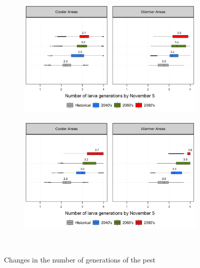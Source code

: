 \documentclass[12pt]{article}
\theoremstyle{plain}
\theoremstyle{definition}
\theoremstyle{definition}
\begin{document}
\begin{figure}[h!]
\begin{subfigure}[b]{0.45\textwidth}
    \end{subfigure}\\    
          \begin{subfigure}[b]{0.45\textwidth}
        \includegraphics[width=\textwidth]{figures/Larva_Gen_Nov_rcp45}
    \end{subfigure}
    \begin{subfigure}[b]{0.45\textwidth}
        \includegraphics[width=\textwidth]{figures/Larva_Gen_Nov_rcp85}
    \end{subfigure}\\
    \caption{Changes in the number of generations of the pest}\label{fig:CNGP}
\end{figure}
\end{document}
